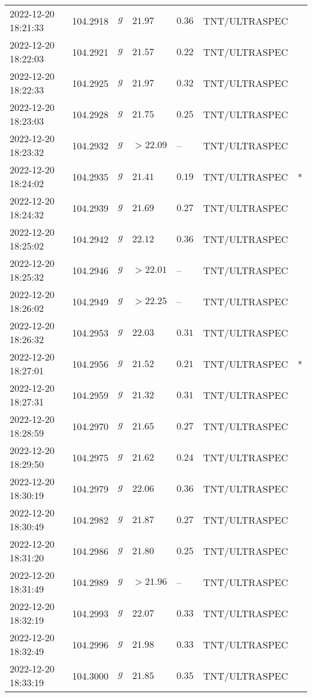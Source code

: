 \documentclass{nature_plusfigure}
\begin{document}
\begin{supplement}
\begin{center}
\begin{longtable}{lllllll}
2022-12-20 18:21:33 & 104.2918 & $g$ & $21.97$ & $0.36$ & TNT/ULTRASPEC &  \\ 
2022-12-20 18:22:03 & 104.2921 & $g$ & $21.57$ & $0.22$ & TNT/ULTRASPEC &  \\ 
2022-12-20 18:22:33 & 104.2925 & $g$ & $21.97$ & $0.32$ & TNT/ULTRASPEC &  \\ 
2022-12-20 18:23:03 & 104.2928 & $g$ & $21.75$ & $0.25$ & TNT/ULTRASPEC &  \\ 
2022-12-20 18:23:32 & 104.2932 & $g$ & $>22.09$ & -- & TNT/ULTRASPEC &  \\ 
2022-12-20 18:24:02 & 104.2935 & $g$ & $21.41$ & $0.19$ & TNT/ULTRASPEC & * \\ 
2022-12-20 18:24:32 & 104.2939 & $g$ & $21.69$ & $0.27$ & TNT/ULTRASPEC &  \\ 
2022-12-20 18:25:02 & 104.2942 & $g$ & $22.12$ & $0.36$ & TNT/ULTRASPEC &  \\ 
2022-12-20 18:25:32 & 104.2946 & $g$ & $>22.01$ & -- & TNT/ULTRASPEC &  \\ 
2022-12-20 18:26:02 & 104.2949 & $g$ & $>22.25$ & -- & TNT/ULTRASPEC &  \\ 
2022-12-20 18:26:32 & 104.2953 & $g$ & $22.03$ & $0.31$ & TNT/ULTRASPEC &  \\ 
2022-12-20 18:27:01 & 104.2956 & $g$ & $21.52$ & $0.21$ & TNT/ULTRASPEC & * \\ 
2022-12-20 18:27:31 & 104.2959 & $g$ & $21.32$ & $0.31$ & TNT/ULTRASPEC &  \\ 
2022-12-20 18:28:59 & 104.2970 & $g$ & $21.65$ & $0.27$ & TNT/ULTRASPEC &  \\ 
2022-12-20 18:29:50 & 104.2975 & $g$ & $21.62$ & $0.24$ & TNT/ULTRASPEC &  \\ 
2022-12-20 18:30:19 & 104.2979 & $g$ & $22.06$ & $0.36$ & TNT/ULTRASPEC &  \\ 
2022-12-20 18:30:49 & 104.2982 & $g$ & $21.87$ & $0.27$ & TNT/ULTRASPEC &  \\ 
2022-12-20 18:31:20 & 104.2986 & $g$ & $21.80$ & $0.25$ & TNT/ULTRASPEC &  \\ 
2022-12-20 18:31:49 & 104.2989 & $g$ & $>21.96$ & -- & TNT/ULTRASPEC &  \\ 
2022-12-20 18:32:19 & 104.2993 & $g$ & $22.07$ & $0.33$ & TNT/ULTRASPEC &  \\ 
2022-12-20 18:32:49 & 104.2996 & $g$ & $21.98$ & $0.33$ & TNT/ULTRASPEC &  \\ 
2022-12-20 18:33:19 & 104.3000 & $g$ & $21.85$ & $0.35$ & TNT/ULTRASPEC &  \\ 

\end{longtable}
\end{center}
\end{supplement}
\end{document}
